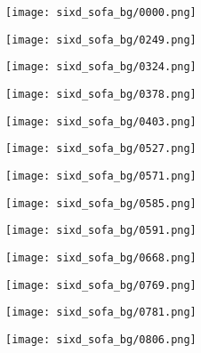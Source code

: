 \begin{figure}[h!]
  \centering
  \begin{subfigure}[b]{0.32\linewidth}
    \texttt{[image: sixd\_sofa\_bg/0000.png]}
  \end{subfigure}
  \begin{subfigure}[b]{0.32\linewidth}
    \texttt{[image: sixd\_sofa\_bg/0249.png]}
  \end{subfigure}
  \begin{subfigure}[b]{0.32\linewidth}
    \texttt{[image: sixd\_sofa\_bg/0324.png]}
  \end{subfigure}
  \begin{subfigure}[b]{0.32\linewidth}
    \texttt{[image: sixd\_sofa\_bg/0378.png]}
  \end{subfigure}
  \begin{subfigure}[b]{0.32\linewidth}
    \texttt{[image: sixd\_sofa\_bg/0403.png]}
  \end{subfigure}
  \begin{subfigure}[b]{0.32\linewidth}
    \texttt{[image: sixd\_sofa\_bg/0527.png]}
  \end{subfigure}
  \begin{subfigure}[b]{0.32\linewidth}
    \texttt{[image: sixd\_sofa\_bg/0571.png]}
  \end{subfigure}
  \begin{subfigure}[b]{0.32\linewidth}
    \texttt{[image: sixd\_sofa\_bg/0585.png]}
  \end{subfigure}
  \begin{subfigure}[b]{0.32\linewidth}
    \texttt{[image: sixd\_sofa\_bg/0591.png]}
  \end{subfigure}
  \begin{subfigure}[b]{0.32\linewidth}
    \texttt{[image: sixd\_sofa\_bg/0668.png]}
  \end{subfigure}
  \begin{subfigure}[b]{0.32\linewidth}
    \texttt{[image: sixd\_sofa\_bg/0769.png]}
  \end{subfigure}
  \begin{subfigure}[b]{0.32\linewidth}
    \texttt{[image: sixd\_sofa\_bg/0781.png]}
  \end{subfigure}
  \begin{subfigure}[b]{0.32\linewidth}
    \texttt{[image: sixd\_sofa\_bg/0806.png]}

\end{subfigure}
\end{figure}

